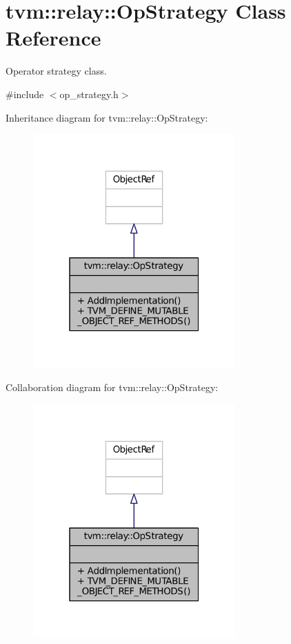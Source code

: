 \hypertarget{classtvm_1_1relay_1_1OpStrategy}{}\section{tvm\+:\+:relay\+:\+:Op\+Strategy Class Reference}
\label{classtvm_1_1relay_1_1OpStrategy}


Operator strategy class.  




{\ttfamily \#include $<$op\+\_\+strategy.\+h$>$}



Inheritance diagram for tvm\+:\+:relay\+:\+:Op\+Strategy\+:
\nopagebreak
\begin{figure}[H]
\begin{center}
\leavevmode
\includegraphics[width=220pt]{classtvm_1_1relay_1_1OpStrategy__inherit__graph}
\end{center}
\end{figure}


Collaboration diagram for tvm\+:\+:relay\+:\+:Op\+Strategy\+:
\nopagebreak
\begin{figure}[H]
\begin{center}
\leavevmode
\includegraphics[width=220pt]{classtvm_1_1relay_1_1OpStrategy__coll__graph}
\end{center}
\end{figure}
